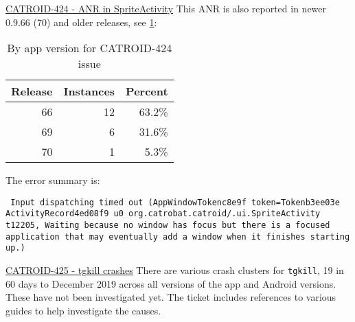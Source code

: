 \href{https://jira.catrob.at/browse/CATROID-424}{CATROID-424 - ANR in SpriteActivity} This ANR is also reported in newer 0.9.66 (70) and older releases, see \ref{tab:catroid_424}:
\begin{table}[ht]
    \centering
    \begin{tabular}{r|r|r}
Release	&Instances	&Percent \\
\hline
66	&12	&63.2\% \\
69	&6	&31.6\% \\
70	&1	&5.3\% \\
    \end{tabular}
    \caption{By app version for CATROID-424 issue}
    \label{tab:catroid_424}
\end{table}

The error summary is:

\texttt{\footnotesize{
Input dispatching timed out (AppWindowToken{c8e9f token=Token{b3ee03e ActivityRecord{4ed08f9 u0 org.catrobat.catroid/.ui.SpriteActivity t12205}}}, Waiting because no window has focus but there is a focused application that may eventually add a window when it finishes starting up.)}}

\href{https://jira.catrob.at/browse/CATROID-425}{CATROID-425 - tgkill crashes} There are various crash clusters for \texttt{tgkill}, 19 in 60 days to  December 2019 across all versions of the app and Android versions. These have not been investigated yet. The ticket includes references to various guides to help investigate the causes.

